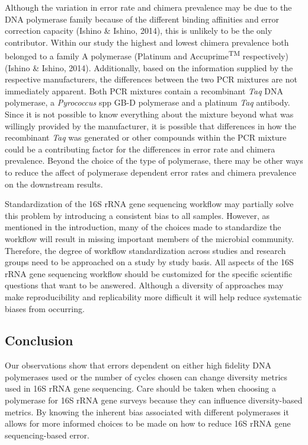 \documentclass[11pt,]{article}
\begin{document}
Although the variation in error rate and chimera prevalence may be due
to the DNA polymerase family because of the different binding affinities
and error correction capacity (Ishino \& Ishino, 2014), this is unlikely
to be the only contributor. Within our study the highest and lowest
chimera prevalence both belonged to a family A polymerase (Platinum and
Accuprime\textsuperscript{TM} respectively) (Ishino \& Ishino, 2014).
Additionally, based on the information supplied by the respective
manufacturers, the differences between the two PCR mixtures are not
immediately apparent. Both PCR mixtures contain a recombinant \emph{Taq}
DNA polymerase, a \emph{Pyrococcus} spp GB-D polymerase and a platinum
\emph{Taq} antibody. Since it is not possible to know everything about
the mixture beyond what was willingly provided by the manufacturer, it
is possible that differences in how the recombinant \emph{Taq} was
generated or other compounds within the PCR mixture could be a
contributing factor for the differences in error rate and chimera
prevalence. Beyond the choice of the type of polymerase, there may be
other ways to reduce the affect of polymerase dependent error rates and
chimera prevalence on the downstream results.

Standardization of the 16S rRNA gene sequencing workflow may partially
solve this problem by introducing a consistent bias to all samples.
However, as mentioned in the introduction, many of the choices made to
standardize the workflow will result in missing important members of the
microbial community. Therefore, the degree of workflow standardization
across studies and research groups need to be approached on a study by
study basis. All aspects of the 16S rRNA gene sequencing workflow should
be customized for the specific scientific questions that want to be
answered. Although a diversity of approaches may make reproducibility
and replicability more difficult it will help reduce systematic biases
from occurring.

\newpage

\subsection{Conclusion}\label{conclusion}

Our observations show that errors dependent on either high fidelity DNA
polymerases used or the number of cycles chosen can change diversity
metrics used in 16S rRNA gene sequencing. Care should be taken when
choosing a polymerase for 16S rRNA gene surveys because they can
influence diversity-based metrics. By knowing the inherent bias
associated with different polymerases it allows for more informed
choices to be made on how to reduce 16S rRNA gene sequencing-based
error.
\end{document}
